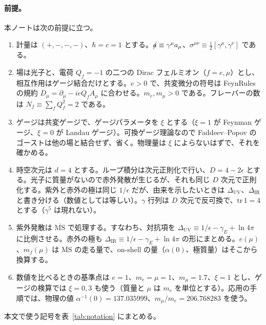 \documentclass[a4paper,10pt]{ltjsarticle}
\newcommand{\MSbar}{\overline{\mathrm{MS}}}
\newcommand{\DUV}{\Delta_{\mathrm{UV}}}
\newcommand{\DIR}{\Delta_{\mathrm{IR}}}
\begin{document}
\paragraph{前提。}本ノートは次の前提に立つ。
\begin{enumerate}
\item 計量は $(+,-,-,-)$、$\hbar=c=1$ とする。$\slashed a\equiv\gamma^\mu a_\mu$、$\sigma^{\mu\nu}\equiv\frac i2[\gamma^\mu,\gamma^\nu]$ である。
\item 場は光子と、電荷 $Q_f=-1$ の二つの Dirac フェルミオン（$f=e,\mu$）とし、相互作用はゲージ結合だけとする。$e>0$ で、共変微分の符号は FeynRules の規約 $D_\mu=\partial_\mu-ieQ_fA_\mu$ に合わせる。$m_e,m_\mu>0$ である。フレーバーの数は $N_f\equiv\sum_fQ_f^2=2$ である。
\item ゲージは共変ゲージで、ゲージパラメータを $\xi$ とする（$\xi=1$ が Feynman ゲージ、$\xi=0$ が Landau ゲージ）。可換ゲージ理論なので Faddeev--Popov のゴーストは他の場と結合せず、省く。物理量は $\xi$ によらないはずで、それを確かめる。
\item 時空次元は $d=4$ とする。ループ積分は次元正則化で行い、$D=4-2\epsilon$ とする。光子に質量がないので赤外発散が生じるが、それも同じ $D$ 次元で正則化する。紫外と赤外の極は同じ $1/\epsilon$ だが、由来を示したいときは $\DUV$、$\DIR$ と書き分ける（数値としては等しい）。$\gamma$ 行列は $D$ 次元で反可換で、$\mathrm{tr}\,1=4$ とする（$\gamma^5$ は現れない）。
\item 紫外発散は $\MSbar$ で処理する。すなわち、対抗項を $\DUV\equiv1/\epsilon-\gamma_E+\ln4\pi$ に比例させる。赤外の極も $\DIR\equiv1/\epsilon-\gamma_E+\ln4\pi$ の形にまとめる。$e(\mu)$、$m_f(\mu)$ は $\MSbar$ の走る量で、on-shell の量（$\alpha(0)$、極質量）はそこから換算する。
\item 数値を比べるときの基準点は $e=1$、$m_e=\mu=1$、$m_\mu=1.7$、$\xi=1$ とし、ゲージの検算では $\xi=0,3$ も使う（質量と $\mu$ は $m_e$ を単位とする）。応用の手順では、物理の値 $\alpha^{-1}(0)=137.035999$、$m_\mu/m_e=206.768283$ を使う。
\end{enumerate}
本文で使う記号を表~\ref{tab:notation} にまとめる。
\end{document}
